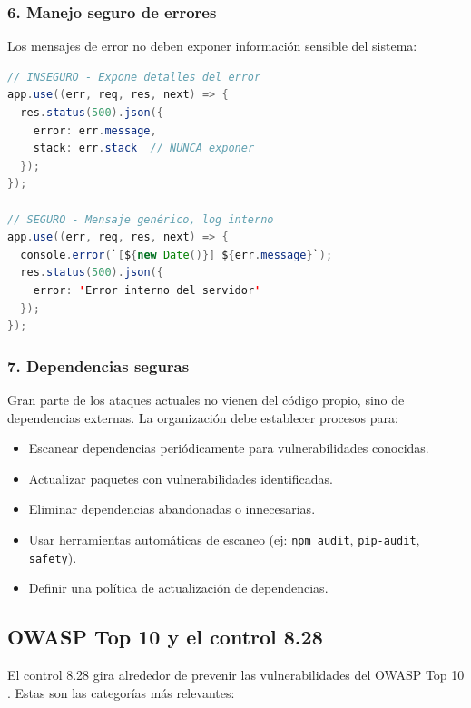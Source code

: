 \subsubsection{6. Manejo seguro de errores}

Los mensajes de error no deben exponer información sensible del sistema:

\begin{lstlisting}[language=Java, caption={Manejo seguro de errores}]
// INSEGURO - Expone detalles del error
app.use((err, req, res, next) => {
  res.status(500).json({
    error: err.message,
    stack: err.stack  // NUNCA exponer
  });
});

// SEGURO - Mensaje genérico, log interno
app.use((err, req, res, next) => {
  console.error(`[${new Date()}] ${err.message}`);
  res.status(500).json({
    error: 'Error interno del servidor'
  });
});
\end{lstlisting}

\subsubsection{7. Dependencias seguras}

Gran parte de los ataques actuales no vienen del código propio, sino de dependencias externas. La organización debe establecer procesos para:

\begin{itemize}
    \item Escanear dependencias periódicamente para vulnerabilidades conocidas.
    \item Actualizar paquetes con vulnerabilidades identificadas.
    \item Eliminar dependencias abandonadas o innecesarias.
    \item Usar herramientas automáticas de escaneo (ej: \texttt{npm audit}, \texttt{pip-audit}, \texttt{safety}).
    \item Definir una política de actualización de dependencias.
\end{itemize}

\subsection{OWASP Top 10 y el control 8.28}

El control 8.28 gira alrededor de prevenir las vulnerabilidades del OWASP Top 10 \cite{owasp2021}. Estas son las categorías más relevantes:

